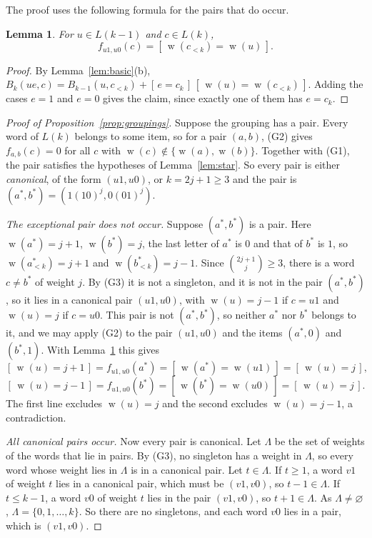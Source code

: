 \documentclass[screen]{aomart}
\newtheorem{lemma}[theorem]{Lemma}
\theoremstyle{definition}
\theoremstyle{remark}
\numberwithin{equation}{section}
\newcommand{\Iv}[1]{[\,#1\,]}
\DeclareMathOperator{\wt}{w}
\begin{document}
The proof uses the following formula for the pairs that do occur.

\begin{lemma}\label{lem:canonical}
For $u\in L(k-1)$ and $c\in L(k)$,
\[
f_{u1,u0}(c)=\Iv{\wt(c_{<k})=\wt(u)} .
\]
\end{lemma}

\begin{proof}
By Lemma~\ref{lem:basic}(b), $B_k(ue,c)=B_{k-1}(u,c_{<k})+\Iv{e=c_k}\,\Iv{\wt(u)=\wt(c_{<k})}$. Adding the cases $e=1$ and $e=0$ gives the claim, since exactly one of them has $e=c_k$.
\end{proof}

\begin{proof}[Proof of Proposition~\ref{prop:groupings}]
Suppose the grouping has a pair. Every word of $L(k)$ belongs to some item, so for a pair $(a,b)$, (G2) gives $f_{a,b}(c)=0$ for all $c$ with $\wt(c)\notin\{\wt(a),\wt(b)\}$. Together with (G1), the pair satisfies the hypotheses of Lemma~\ref{lem:star}. So every pair is either \emph{canonical}, of the form $(u1,u0)$, or $k=2j+1\ge3$ and the pair is $(a^*,b^*)=(1(10)^j,0(01)^j)$.

\emph{The exceptional pair does not occur.} Suppose $(a^*,b^*)$ is a pair. Here $\wt(a^*)=j+1$, $\wt(b^*)=j$, the last letter of $a^*$ is $0$ and that of $b^*$ is $1$, so $\wt(a^*_{<k})=j+1$ and $\wt(b^*_{<k})=j-1$. Since $\binom{2j+1}{j}\ge3$, there is a word $c\ne b^*$ of weight $j$. By (G3) it is not a singleton, and it is not in the pair $(a^*,b^*)$, so it lies in a canonical pair $(u1,u0)$, with $\wt(u)=j-1$ if $c=u1$ and $\wt(u)=j$ if $c=u0$. This pair is not $(a^*,b^*)$, so neither $a^*$ nor $b^*$ belongs to it, and we may apply (G2) to the pair $(u1,u0)$ and the items $(a^*,0)$ and $(b^*,1)$. With Lemma~\ref{lem:canonical} this gives
\[
\Iv{\wt(u)=j+1}=f_{u1,u0}(a^*)=\Iv{\wt(a^*)=\wt(u1)}=\Iv{\wt(u)=j},
\]
\[
\Iv{\wt(u)=j-1}=f_{u1,u0}(b^*)=\Iv{\wt(b^*)=\wt(u0)}=\Iv{\wt(u)=j}.
\]
The first line excludes $\wt(u)=j$ and the second excludes $\wt(u)=j-1$, a contradiction.

\emph{All canonical pairs occur.} Now every pair is canonical. Let $\Lambda$ be the set of weights of the words that lie in pairs. By (G3), no singleton has a weight in $\Lambda$, so every word whose weight lies in $\Lambda$ is in a canonical pair. Let $t\in\Lambda$. If $t\ge1$, a word $v1$ of weight $t$ lies in a canonical pair, which must be $(v1,v0)$, so $t-1\in\Lambda$. If $t\le k-1$, a word $v0$ of weight $t$ lies in the pair $(v1,v0)$, so $t+1\in\Lambda$. As $\Lambda\ne\varnothing$, $\Lambda=\{0,1,\dots,k\}$. So there are no singletons, and each word $v0$ lies in a pair, which is $(v1,v0)$.
\end{proof}
\end{document}

